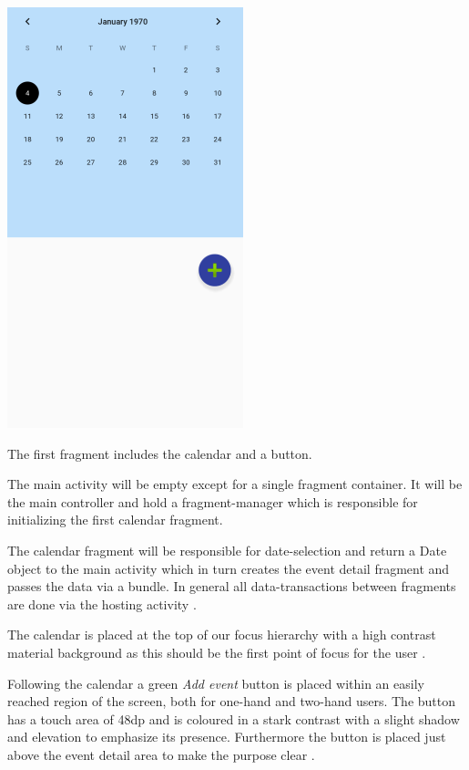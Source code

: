 \documentclass[]{article}
\begin{document}
\begin{flushleft}
\begin{floatingfigure}[r]{0.3\linewidth}
	\includegraphics[scale=0.7]{img/date_fragment.png}
	\caption{The first fragment includes the calendar and a button.}
	\label{fig:calendar}
	\vspace{\dimexpr0.3\baselineskip-\topskip}
\end{floatingfigure}

The main activity will be empty except for a single fragment container.
It will be the main controller and hold a fragment-manager which is responsible for initializing the first calendar fragment.\medskip

The calendar fragment will be responsible for date-selection and return a Date object to the main activity which in turn creates the event detail fragment and passes the data via a bundle. In general all data-transactions between fragments are done via the hosting activity \parencite{dev:1}.\medskip

The calendar is placed at the top of our focus hierarchy with a high contrast material background as this should be the first point of focus for the user \parencite{button:2}.\smallskip


Following the calendar a green \textit{Add event} button is placed within an easily reached  region of the screen, both for one-hand and two-hand users. The button has a touch area of 48dp and is coloured in a stark contrast with a slight shadow and elevation to emphasize its presence. Furthermore the button is placed just above the event detail area to make the purpose clear \parencite{button:1}.



\end{flushleft}
\end{document}
